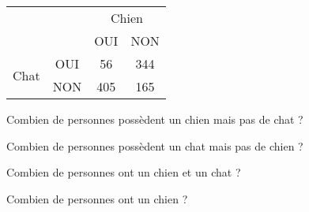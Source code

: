 \begin{center}
  \begin{tabular}{|c|c|c|c|}
\cline{3-4}
\multicolumn{2}{c|}{}&\multicolumn{2}{c|}{Chien}\\
\cline{3-4}
\multicolumn{2}{c|}{}&OUI&NON\\
\hline
\multirow{2}{2.5cm}{\centerline{Chat}}&OUI&56&344\\
\cline{2-4}
&NON&405&165\\
\hline
  \end{tabular}
\end{center}
\begin{myenumerate}
  \item Combien de personnes possèdent un chien mais pas de chat ?
  \item Combien de personnes possèdent un chat mais pas de chien ?
  \item Combien de personnes ont un chien et un chat ?
  \item Combien de personnes ont un chien ?
\end{myenumerate}
